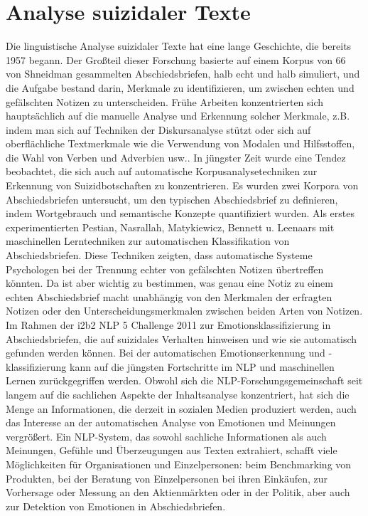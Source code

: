 \documentclass[conference]{IEEEtran}
\begin{document}
\section{Analyse suizidaler Texte}
Die linguistische Analyse suizidaler Texte hat eine lange Geschichte, die bereits 1957 begann. Der Großteil dieser Forschung basierte auf einem Korpus von 66 von Shneidman gesammelten Abschiedsbriefen, halb echt und halb simuliert, und die Aufgabe bestand darin, Merkmale zu identifizieren, um zwischen echten und gefälschten Notizen zu unterscheiden. Frühe Arbeiten konzentrierten sich hauptsächlich auf die manuelle Analyse und Erkennung solcher Merkmale, z.B. indem man sich auf Techniken der Diskursanalyse stützt oder sich auf oberflächliche Textmerkmale wie die Verwendung von Modalen und Hilfsstoffen, die Wahl von Verben und Adverbien usw.. In jüngster Zeit wurde eine Tendez beobachtet, die sich auch auf automatische Korpusanalysetechniken zur Erkennung von Suizidbotschaften zu konzentrieren. Es wurden zwei Korpora von Abschiedsbriefen untersucht, um den typischen Abschiedsbrief zu definieren, indem Wortgebrauch und semantische Konzepte quantifiziert wurden. Als erstes experimentierten Pestian, Nasrallah, Matykiewicz, Bennett u. Leenaars mit maschinellen Lerntechniken zur automatischen Klassifikation von Abschiedsbriefen. Diese Techniken zeigten, dass automatische Systeme Psychologen bei der Trennung echter von gefälschten Notizen übertreffen könnten. Da ist aber wichtig zu bestimmen, was genau eine Notiz zu einem echten Abschiedsbrief macht unabhängig von den Merkmalen der erfragten Notizen oder den Unterscheidungsmerkmalen zwischen beiden Arten von Notizen.
Im Rahmen der i2b2 NLP 5 Challenge 2011 zur Emotionsklassifizierung in Abschiedsbriefen, die auf suizidales Verhalten hinweisen und wie sie automatisch gefunden werden können. Bei der automatischen Emotionserkennung und -klassifizierung kann auf die jüngsten Fortschritte im NLP und maschinellen Lernen zurückgegriffen werden. Obwohl sich die NLP-Forschungsgemeinschaft seit langem auf die sachlichen Aspekte der Inhaltsanalyse konzentriert, hat sich die Menge an Informationen, die derzeit in sozialen Medien produziert werden, auch das Interesse an der automatischen Analyse von Emotionen und Meinungen vergrößert. 
Ein NLP-System, das sowohl sachliche Informationen als auch Meinungen, Gefühle und Überzeugungen aus Texten extrahiert, schafft viele Möglichkeiten für Organisationen und Einzelpersonen: beim Benchmarking von Produkten, bei der Beratung von Einzelpersonen bei ihren Einkäufen, zur Vorhersage oder Messung an den Aktienmärkten oder in der Politik, aber auch zur Detektion von Emotionen in Abschiedsbriefen.\cite{b4}
\end{document}
